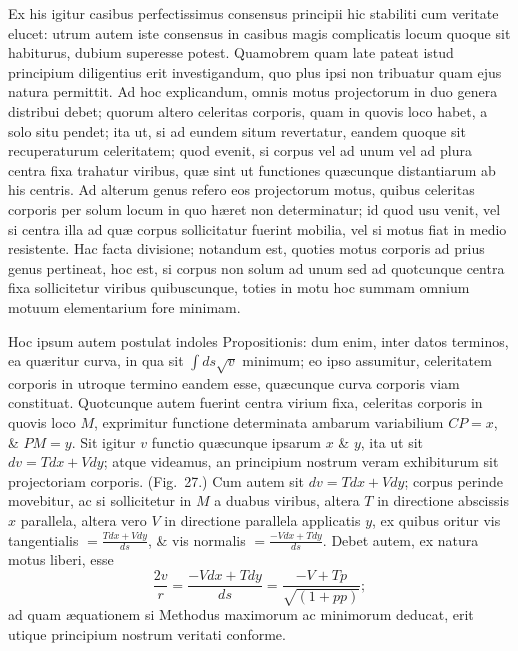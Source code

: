 Ex his igitur casibus perfectissimus consensus principii hic stabiliti cum veritate elucet: utrum autem iste consensus in casibus magis complicatis locum quoque sit habiturus, dubium superesse potest. Quamobrem quam late pateat istud principium diligentius erit investigandum, quo plus ipsi non tribuatur quam ejus natura permittit. Ad hoc explicandum, omnis motus projectorum in duo genera distribui debet; quorum altero celeritas corporis, quam in quovis loco habet, a solo situ pendet; ita ut, si ad eundem situm revertatur, eandem quoque sit recuperaturum celeritatem; quod evenit, si corpus vel ad unum vel ad plura centra fixa trahatur viribus, quæ sint ut functiones quæcunque distantiarum ab his centris. Ad alterum genus refero eos projectorum motus, quibus celeritas corporis per solum locum in quo hæret non determinatur; id quod usu venit, vel si centra illa ad quæ corpus sollicitatur fuerint mobilia, vel si motus fiat in medio resistente. Hac facta divisione; notandum est, quoties motus corporis ad prius genus pertineat, hoc est, si corpus non solum ad unum sed ad quotcunque centra fixa sollicitetur viribus quibuscunque, toties in motu hoc summam omnium motuum elementarium fore minimam.

Hoc ipsum autem postulat indoles Propositionis: dum enim, inter datos terminos, ea quæritur curva, in qua sit $\int ds\sqrt v$ minimum; eo ipso assumitur, celeritatem corporis in utroque termino eandem esse, quæcunque curva corporis viam constituat. Quotcunque autem fuerint centra virium fixa, celeritas corporis in quovis loco $M$, exprimitur functione determinata ambarum variabilium $CP=x$, \& $PM=y$. Sit igitur $v$ functio quæcunque ipsarum $x$ \& $y$, ita ut sit $dv=Tdx+Vdy$; atque videamus, an principium nostrum veram exhibiturum sit projectoriam corporis. (Fig.~27.) Cum autem sit $dv=Tdx+Vdy$; corpus perinde movebitur, ac si sollicitetur in $M$ a duabus viribus, altera $T$ in directione abscissis $x$ parallela, altera vero $V$ in directione parallela applicatis $y$, ex quibus oritur vis tangentialis $=\frac{Tdx+Vdy}{ds}$, \& vis normalis $=\frac{-Vdx+Tdy}{ds}$. Debet autem, ex natura motus liberi, esse
\[\frac{2v}{r}=\frac{-Vdx+Tdy}{ds}=\frac{-V+Tp}{\sqrt{(1+pp)}};\]
ad quam æquationem si Methodus maximorum ac minimorum deducat, erit utique principium nostrum veritati conforme.

